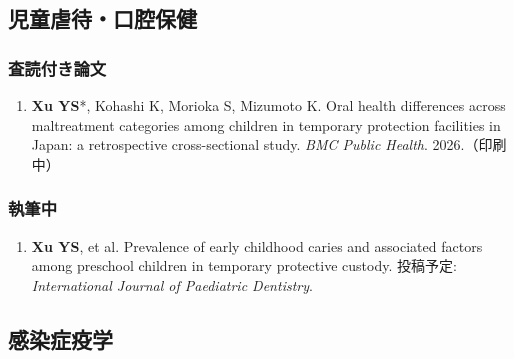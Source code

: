 \documentclass[a4paper,10pt]{article}
\newcommand{\me}{\textbf{Xu YS}}
\begin{document}
\subsection{児童虐待・口腔保健}
\subsubsection{査読付き論文}
\begin{enumerate}
  \item \me*, Kohashi K, Morioka S, Mizumoto K. Oral health differences across maltreatment categories among children in temporary protection facilities in Japan: a retrospective cross-sectional study. \textit{BMC Public Health}. 2026.（印刷中）
\end{enumerate}
\subsubsection{執筆中}
\begin{enumerate}
  \item \me, et al. Prevalence of early childhood caries and associated factors among preschool children in temporary protective custody. 投稿予定: \textit{International Journal of Paediatric Dentistry}.
\end{enumerate}

\subsection{感染症疫学}
\end{document}
